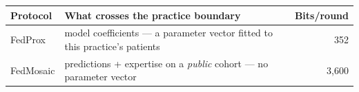 \begin{tabular}{lp{7.4cm}r}
    \toprule
    Protocol & What crosses the practice boundary & Bits/round \\
    \midrule
    FedProx & model coefficients --- a parameter vector fitted to this practice's patients & 352 \\
    FedMosaic & predictions + expertise on a \emph{public} cohort --- no parameter vector & 3,600 \\
    \bottomrule
\end{tabular}
